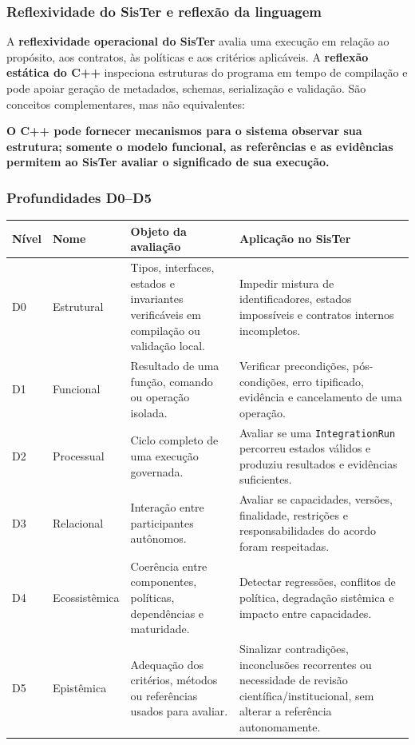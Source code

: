 \documentclass[11pt,a4paper,oneside]{article}
\begin{document}
\subsubsection{Reflexividade do SisTer e reflexão da linguagem}
A \textbf{reflexividade operacional do SisTer} avalia uma execução em relação ao propósito, aos contratos, às políticas e aos critérios aplicáveis. A \textbf{reflexão estática do C++} inspeciona estruturas do programa em tempo de compilação e pode apoiar geração de metadados, schemas, serialização e validação. São conceitos complementares, mas não equivalentes:

\begin{principio}
\textbf{O C++ pode fornecer mecanismos para o sistema observar sua estrutura; somente o modelo funcional, as referências e as evidências permitem ao SisTer avaliar o significado de sua execução.}
\end{principio}

\subsubsection{Profundidades D0--D5}
\begin{longtable}{P{1.5cm}P{3.4cm}P{5.0cm}P{5.0cm}}
\toprule
\textbf{Nível} & \textbf{Nome} & \textbf{Objeto da avaliação} & \textbf{Aplicação no SisTer} \\
\midrule
\endhead
D0 & Estrutural & Tipos, interfaces, estados e invariantes verificáveis em compilação ou validação local. & Impedir mistura de identificadores, estados impossíveis e contratos internos incompletos. \\
D1 & Funcional & Resultado de uma função, comando ou operação isolada. & Verificar precondições, pós-condições, erro tipificado, evidência e cancelamento de uma operação. \\
D2 & Processual & Ciclo completo de uma execução governada. & Avaliar se uma \texttt{IntegrationRun} percorreu estados válidos e produziu resultados e evidências suficientes. \\
D3 & Relacional & Interação entre participantes autônomos. & Avaliar se capacidades, versões, finalidade, restrições e responsabilidades do acordo foram respeitadas. \\
D4 & Ecossistêmica & Coerência entre componentes, políticas, dependências e maturidade. & Detectar regressões, conflitos de política, degradação sistêmica e impacto entre capacidades. \\
D5 & Epistêmica & Adequação dos critérios, métodos ou referências usados para avaliar. & Sinalizar contradições, inconclusões recorrentes ou necessidade de revisão científica/institucional, sem alterar a referência autonomamente. \\
\bottomrule
\end{longtable}
\end{document}
